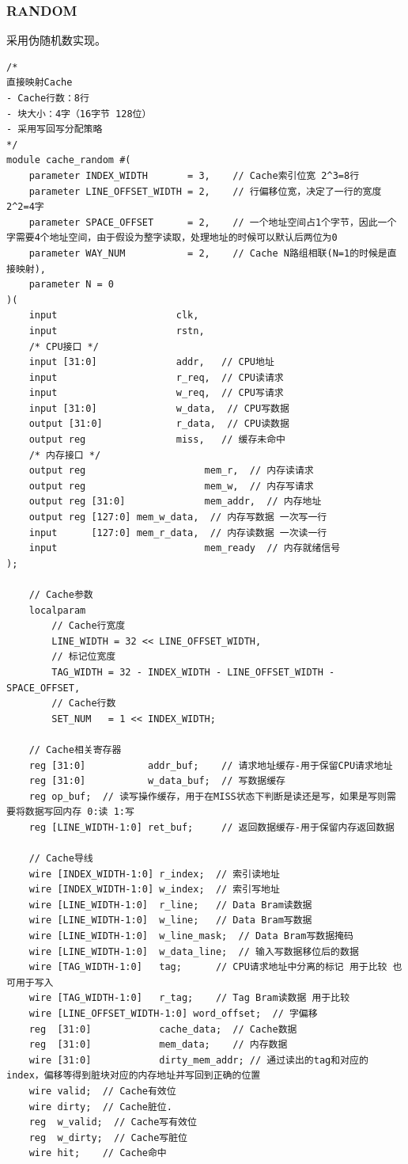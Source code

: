 \documentclass[12pt,a4paper]{ctexart}
\begin{document}
\subsubsection{RANDOM}
采用伪随机数实现。
\begin{lstlisting}[style=verilog]
/*
直接映射Cache
- Cache行数：8行
- 块大小：4字（16字节 128位）
- 采用写回写分配策略
*/
module cache_random #(
    parameter INDEX_WIDTH       = 3,    // Cache索引位宽 2^3=8行
    parameter LINE_OFFSET_WIDTH = 2,    // 行偏移位宽，决定了一行的宽度 2^2=4字
    parameter SPACE_OFFSET      = 2,    // 一个地址空间占1个字节，因此一个字需要4个地址空间，由于假设为整字读取，处理地址的时候可以默认后两位为0
    parameter WAY_NUM           = 2,    // Cache N路组相联(N=1的时候是直接映射),
    parameter N = 0
)(
    input                     clk,    
    input                     rstn,
    /* CPU接口 */  
    input [31:0]              addr,   // CPU地址
    input                     r_req,  // CPU读请求
    input                     w_req,  // CPU写请求
    input [31:0]              w_data,  // CPU写数据
    output [31:0]             r_data,  // CPU读数据
    output reg                miss,   // 缓存未命中
    /* 内存接口 */  
    output reg                     mem_r,  // 内存读请求
    output reg                     mem_w,  // 内存写请求
    output reg [31:0]              mem_addr,  // 内存地址
    output reg [127:0] mem_w_data,  // 内存写数据 一次写一行
    input      [127:0] mem_r_data,  // 内存读数据 一次读一行
    input                          mem_ready  // 内存就绪信号
);

    // Cache参数
    localparam
        // Cache行宽度
        LINE_WIDTH = 32 << LINE_OFFSET_WIDTH,
        // 标记位宽度
        TAG_WIDTH = 32 - INDEX_WIDTH - LINE_OFFSET_WIDTH - SPACE_OFFSET,
        // Cache行数
        SET_NUM   = 1 << INDEX_WIDTH;
    
    // Cache相关寄存器
    reg [31:0]           addr_buf;    // 请求地址缓存-用于保留CPU请求地址
    reg [31:0]           w_data_buf;  // 写数据缓存
    reg op_buf;  // 读写操作缓存，用于在MISS状态下判断是读还是写，如果是写则需要将数据写回内存 0:读 1:写
    reg [LINE_WIDTH-1:0] ret_buf;     // 返回数据缓存-用于保留内存返回数据

    // Cache导线
    wire [INDEX_WIDTH-1:0] r_index;  // 索引读地址
    wire [INDEX_WIDTH-1:0] w_index;  // 索引写地址
    wire [LINE_WIDTH-1:0]  r_line;   // Data Bram读数据
    wire [LINE_WIDTH-1:0]  w_line;   // Data Bram写数据
    wire [LINE_WIDTH-1:0]  w_line_mask;  // Data Bram写数据掩码
    wire [LINE_WIDTH-1:0]  w_data_line;  // 输入写数据移位后的数据
    wire [TAG_WIDTH-1:0]   tag;      // CPU请求地址中分离的标记 用于比较 也可用于写入
    wire [TAG_WIDTH-1:0]   r_tag;    // Tag Bram读数据 用于比较
    wire [LINE_OFFSET_WIDTH-1:0] word_offset;  // 字偏移
    reg  [31:0]            cache_data;  // Cache数据
    reg  [31:0]            mem_data;    // 内存数据
    wire [31:0]            dirty_mem_addr; // 通过读出的tag和对应的index，偏移等得到脏块对应的内存地址并写回到正确的位置
    wire valid;  // Cache有效位
    wire dirty;  // Cache脏位.
    reg  w_valid;  // Cache写有效位
    reg  w_dirty;  // Cache写脏位
    wire hit;    // Cache命中


\end{lstlisting}
\end{document}
